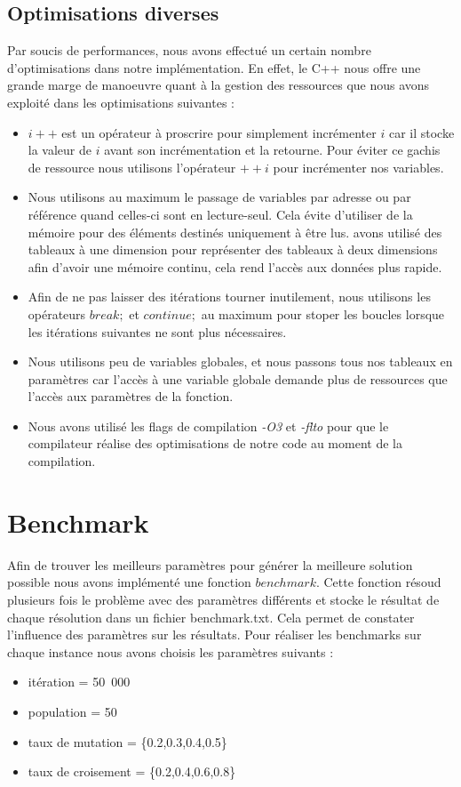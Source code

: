 \documentclass{article}
\begin{document}
    \newpage
    \subsection{Optimisations diverses}
    Par soucis de performances, nous avons effectué un certain nombre d'optimisations dans notre implémentation. En effet, le C++ nous offre une grande marge de manoeuvre quant à la gestion des ressources que nous avons exploité dans les optimisations suivantes : 
    \begin{itemize} 
        \item $i++$ est un opérateur à proscrire pour simplement incrémenter $i$ car il stocke la valeur de $i$ avant son incrémentation et la retourne. Pour éviter ce gachis de ressource nous utilisons l'opérateur $++i$ pour incrémenter nos variables.
        \item Nous utilisons au maximum le passage de variables par adresse ou par référence quand celles-ci sont en lecture-seul. Cela évite d'utiliser de la mémoire pour des éléments destinés uniquement à être lus.
        \Nous avons utilisé des tableaux à une dimension pour représenter des tableaux à deux dimensions afin d'avoir une mémoire continu, cela rend l'accès aux données plus rapide.
        \item Afin de ne pas laisser des itérations tourner inutilement, nous utilisons les opérateurs $break;$ et $continue;$ au maximum pour stoper les boucles lorsque les itérations suivantes ne sont plus nécessaires.
        \item Nous utilisons peu de variables globales, et nous passons tous nos tableaux en paramètres car l'accès à une variable globale demande plus de ressources que l'accès aux paramètres de la fonction.
        \item Nous avons utilisé les flags de compilation \emph{-O3} et \emph{-flto} pour que le compilateur réalise des optimisations de notre code au moment de la compilation.
    
    \end{itemize}
    
\newpage
\section{Benchmark}
Afin de trouver les meilleurs paramètres pour générer la meilleure solution possible nous avons implémenté une fonction $benchmark$. Cette fonction résoud plusieurs fois le problème avec des paramètres différents et stocke le résultat de chaque résolution dans un fichier benchmark.txt. Cela permet de constater l'influence des paramètres sur les résultats. Pour réaliser les benchmarks sur chaque instance nous avons choisis les paramètres suivants :
\begin{itemize}
    \item itération = 50\ 000
    \item population = 50
    \item taux de mutation  = \{0.2,0.3,0.4,0.5\}
    \item taux de croisement = \{0.2,0.4,0.6,0.8\}
\end{itemize}
\end{document}
